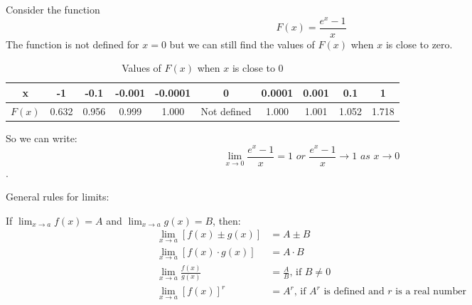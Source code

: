\documentclass[10pt,a4paper]{book}
\theoremstyle{definition}\newtheorem{definition}{Definition}
\theoremstyle{definition}\newtheorem{fact}{Fact}
\theoremstyle{definition}\newtheorem{ex}{Ex.}
\theoremstyle{definition}\newtheorem{project}{Project}
\theoremstyle{definition}\newtheorem{problem}{Problem}
\theoremstyle{definition}\newtheorem{example}{Example}
\numberwithin{theorem}{chapter}
\numberwithin{corollary}{chapter}
\numberwithin{assumption}{chapter}
\numberwithin{definition}{chapter}
\numberwithin{prop}{chapter}
\numberwithin{notation}{chapter}
\numberwithin{problem}{chapter}
\numberwithin{example}{chapter}
\numberwithin{fact}{chapter}
\numberwithin{ex}{chapter}
\begin{document}
	Consider the function
	$$F(x) = \frac{e^x-1}{x}$$
	The function is not defined for $x=0$ but we can still find the values of $F(x)$ when $x$ is close to zero.
	
	\begin{table}[ht]
		\centering
		\begin{tabular}{|c|c|c|c|c|c|c|c|c|c|}
			\hline
			x      & -1    & -0.1  & -0.001 & -0.0001 & 0           & 0.0001 & 0.001 & 0.1   & 1     \\
			\hline
			$F(x)$ & 0.632 & 0.956 & 0.999  & 1.000   & Not defined & 1.000  & 1.001 & 1.052 & 1.718 \\
			\hline
		\end{tabular}
		\caption{Values of $F(x)$ when $x$ is close to 0}
	\end{table}
	
	So we can write:
	$$\lim_{x \rightarrow 0} \frac{e^x-1}{x}=1 \,\, or \,\, \frac{e^x-1}{x} \rightarrow 1 \,\, as \,\, x \rightarrow 0 $$.
	
	General rules for limits:
	
	If $\lim_{x \rightarrow a} f(x) = A$ and $\lim_{x \rightarrow a} g(x) = B$, then:
	\begin{align*}
		\lim_{x \rightarrow a} [f(x) \pm g(x)]   & = A \pm B                                                                  \\
		\lim_{x \rightarrow a} [f(x) \cdot g(x)] & = A \cdot B                                                                \\
		\lim_{x \rightarrow a} \frac{f(x)}{g(x)} & = \frac{A}{B} \text{,  if } B \neq 0                                       \\
		\lim_{x \rightarrow a} [f(x)]^r          & = A^r \text{,  if } A^r \text{ is defined and } r \text{ is a real number} 
	\end{align*}
	
\end{document}
